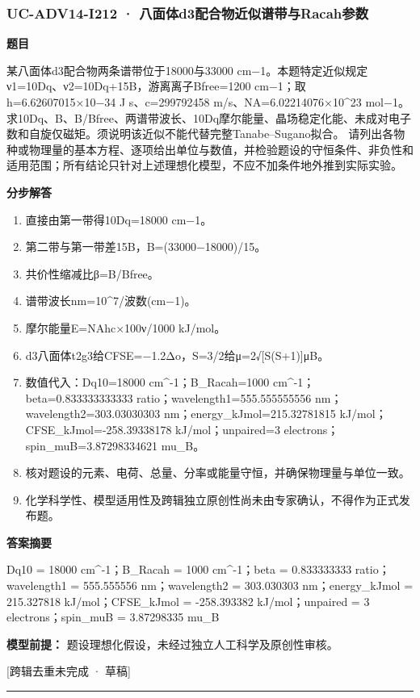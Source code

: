 \documentclass[UTF8,11pt,a4paper]{ctexart}
\begin{document}
\subsubsection*{UC-ADV14-I212 · 八面体d3配合物近似谱带与Racah参数}
\noindent\textbf{题目}\par
某八面体d3配合物两条谱带位于18000与33000 cm−1。本题特定近似规定ν1=10Dq、ν2=10Dq+15B，游离离子Bfree=1200 cm−1；取h=6.62607015×10−34 J s、c=299792458 m/s、NA=6.02214076×10\textasciicircum{}23 mol−1。求10Dq、B、B/Bfree、两谱带波长、10Dq摩尔能量、晶场稳定化能、未成对电子数和自旋仅磁矩。须说明该近似不能代替完整Tanabe–Sugano拟合。 请列出各物种或物理量的基本方程、逐项给出单位与数值，并检验题设的守恒条件、非负性和适用范围；所有结论只针对上述理想化模型，不应不加条件地外推到实际实验。\par
\medskip\noindent\textbf{分步解答}
\begin{enumerate}
\item 直接由第一带得10Dq=18000 cm−1。
\item 第二带与第一带差15B，B=(33000−18000)/15。
\item 共价性缩减比β=B/Bfree。
\item 谱带波长nm=10\textasciicircum{}7/波数(cm−1)。
\item 摩尔能量E=NAhc×100ν/1000 kJ/mol。
\item d3八面体t2g3给CFSE=−1.2Δo，S=3/2给μ=2√[S(S+1)]μB。
\item 数值代入：Dq10=18000 cm\textasciicircum{}-1；B\_Racah=1000 cm\textasciicircum{}-1；beta=0.833333333333 ratio；wavelength1=555.555555556 nm；wavelength2=303.03030303 nm；energy\_kJmol=215.32781815 kJ/mol；CFSE\_kJmol=-258.39338178 kJ/mol；unpaired=3 electrons；spin\_muB=3.87298334621 mu\_B。
\item 核对题设的元素、电荷、总量、分率或能量守恒，并确保物理量与单位一致。
\item 化学科学性、模型适用性及跨辑独立原创性尚未由专家确认，不得作为正式发布题。
\end{enumerate}
\noindent\textbf{答案摘要}\par
Dq10 = 18000 cm\textasciicircum{}-1；B\_Racah = 1000 cm\textasciicircum{}-1；beta = 0.833333333 ratio；wavelength1 = 555.555556 nm；wavelength2 = 303.030303 nm；energy\_kJmol = 215.327818 kJ/mol；CFSE\_kJmol = -258.393382 kJ/mol；unpaired = 3 electrons；spin\_muB = 3.87298335 mu\_B\par
\noindent\textbf{模型前提：}
题设理想化假设，未经过独立人工科学及原创性审核。\par
\noindent\textcolor{red!65!black}{[跨辑去重未完成 · 草稿]} \par
\medskip\hrule\medskip
{}
\end{document}
